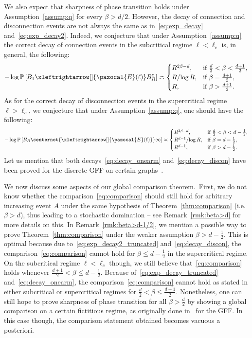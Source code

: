 \documentclass[10pt]{amsart}
\theoremstyle{definition}\newtheorem{defi}[theo]{Definition}\newtheorem{rema}[theo]{Remark}\newtheorem{exam}[theo]{Example}\newtheorem{exem}[theo]{Example}\newtheorem{nota}[theo]{Notation}
\renewcommand{\P}{\mathbb{P}}
\newcommand{\sfc}{\mathsf{c}}
\newcommand{\lr}[4]{#3\xleftrightarrow[#1]{#2} #4}
\newcommand{\nlr}[4]{#3\centernot{\xleftrightarrow[#1]{#2}} #4}
\begin{document}
We also expect that sharpness of phase transition holds under Assumption~\ref{assump:q} for every $\beta>d/2$. However, the decay of connection and disconnection events are not always the same as in~\eqref{eq:exp_decay} and~\eqref{eq:exp_decay2}. Indeed, we conjecture that under Assumption~\ref{assump:q} the correct decay of connection events in the subcritical regime $\ell<\ell_c$ is, in general, the following:
\begin{equation}\label{eq:decay_onearm}
-\log\P\left[\lr{}{\pazocal{E}(\ell)}{B_1}{B_R^{\sfc}}\right]\asymp
\begin{cases}
R^{2\beta-d}, & \text{if }\frac{d}{2}<\beta< \frac{d+1}{2},\\
{R}/{\log R}, & \text{if }\beta=\frac{d+1}{2},\\
R, & \text{if }\beta>\frac{d+1}{2}.
\end{cases}
\end{equation}
As for the correct decay of disconnection events in the supercritical regime $\ell>\ell_c$, we conjecture that under Assumption~\ref{assump:q}, one should have the following:
\begin{equation}\label{eq:decay_discon}
-\log\P\left[\nlr{}{\pazocal{E}(\ell)}{B_R}{\infty}\right]\asymp
\begin{cases}
R^{2\beta-d}, & \text{if }\frac{d}{2}<\beta<d-\frac{1}{2},\\
{R^{d-1}}/{\log R}, & \text{if }\beta=d-\frac{1}{2},\\
R^{d-1}, & \text{if }\beta>d-\frac{1}{2}.
\end{cases}
\end{equation}
Let us mention that both decays~\eqref{eq:decay_onearm} and~\eqref{eq:decay_discon} have been proved for the discrete GFF on certain graphs~\cite{DPR21,GRS21,nitzschner2018,nitzschner2017solidification,PopovRath15,MR3417515}.

We now discuss some aspects of our global comparison theorem.~First, we do not know whether the comparison~\eqref{eq:comparison} should still hold for arbitrary increasing event $A$ under the same hypothesis of Theorem~\ref{thm:comparison} (i.e.~$\beta>d$), thus leading to a stochastic domination -- see Remark~\ref{rmk:beta>d} for more details on this. In Remark~\ref{rmk:beta>d-1/2}, we mention a possible way to prove Theorem~\ref{thm:comparison} under the weaker assumption $\beta>d-\tfrac{1}{2}$. This is optimal because due to~\eqref{eq:exp_decay2_truncated} and~\eqref{eq:decay_discon}, the comparison~\eqref{eq:comparison} cannot hold for $\beta\leq d-\tfrac12$ in the supercritical regime. On the subcritical regime $\ell<\ell_c$ though, we still believe that~\eqref{eq:comparison} holds whenever $\tfrac{d+1}{2}<\beta\leq d-\tfrac{1}{2}$. Because of~\eqref{eq:exp_decay_truncated} and~\eqref{eq:decay_onearm}, the comparison~\eqref{eq:comparison} cannot hold as stated in either subcritical or supercritical regimes for $\tfrac{d}{2}<\beta\leq\tfrac{d+1}{2}$. Nonetheless, one can still hope to prove sharpness of phase transition for all $\beta>\tfrac{d}{2}$ by showing a global comparison on a certain fictitious regime, as originally done in~\cite{DGRS19} for the GFF. In this case though, the comparison statement obtained becomes vacuous a posteriori.
\end{document}
